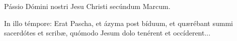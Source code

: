 
Pássio Dómini nostri Jesu Christi secúndum Marcum.

In illo témpore: Erat Pascha, et ázyma post bíduum, et quærébant summi sacerdótes et scribæ, quómodo Jesum dolo tenérent et occíderent...
\par
